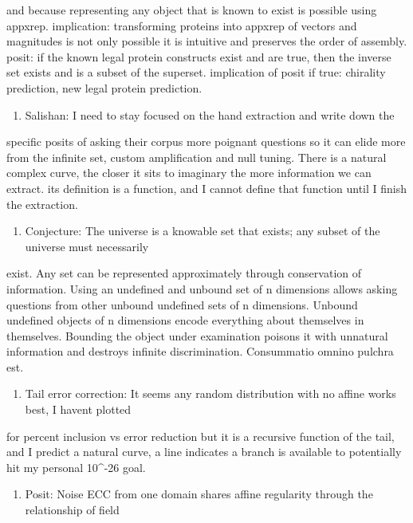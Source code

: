 and because representing any object that is known to exist is possible using appxrep. implication: transforming proteins into appxrep of vectors and magnitudes is not only possible it is intuitive and preserves the order of assembly. posit: if the known legal protein constructs exist and are true, then the inverse set exists and is a subset of the superset. implication of posit if true: chirality prediction, new legal protein prediction.

\begin{enumerate}
\item Salishan: I need to stay focused on the hand extraction and write down the 
\end{enumerate}

specific posits of asking their corpus more poignant questions so it can elide more from the infinite set, custom amplification and null tuning. There is a natural complex curve, the closer it sits to imaginary the more information we can extract. its definition is a function, and I cannot define that function until I finish the extraction.

\begin{enumerate}
\item Conjecture: The universe is a knowable set that exists; any subset of the universe must necessarily
\end{enumerate}

exist. Any set can be represented approximately through conservation of information. Using an undefined and unbound set of n dimensions allows asking questions from other unbound undefined sets of n dimensions. Unbound undefined objects of n dimensions encode everything about themselves in themselves. Bounding the object under examination poisons it with unnatural information and destroys infinite discrimination. Consummatio omnino pulchra est.

\begin{enumerate}
\item Tail error correction: It seems any random distribution with no affine works best, I havent plotted 
\end{enumerate}

for percent inclusion vs error reduction but it is a recursive function of the tail, and I predict a natural curve, a line indicates a branch is available to potentially hit my personal 10\textasciicircum{}-26 goal.

\begin{enumerate}
\item Posit: Noise ECC from one domain shares affine regularity through the relationship of field
\end{enumerate}

